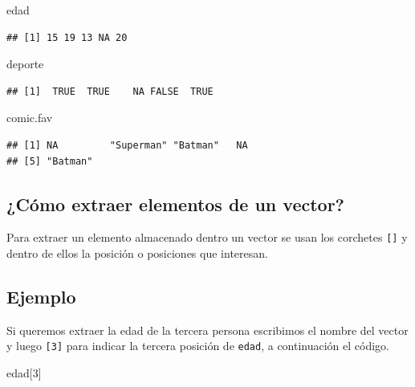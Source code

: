 \documentclass[10pt,]{krantz}
\makeatletter
\newenvironment{Shaded}{\begin{snugshade}}{\end{snugshade}}
\newcommand{\DecValTok}[1]{\textcolor[rgb]{0.00,0.00,0.81}{{#1}}}
\newcommand{\NormalTok}[1]{{#1}}
\newenvironment{kframe}{%
\medskip{}
\setlength{\fboxsep}{.8em}
 \def\at@end@of@kframe{}%
 \ifinner\ifhmode%
  \def\at@end@of@kframe{\end{minipage}}%
  \begin{minipage}{\columnwidth}%
 \fi\fi%
 \def\FrameCommand##1{\hskip\@totalleftmargin \hskip-\fboxsep
 \colorbox{shadecolor}{##1}\hskip-\fboxsep
     \hskip-\linewidth \hskip-\@totalleftmargin \hskip\columnwidth}%
 \MakeFramed {\advance\hsize-\width
   \@totalleftmargin\z@ \linewidth\hsize
   \@setminipage}}%
 {\par\unskip\endMakeFramed%
 \at@end@of@kframe}
\renewenvironment{Shaded}{\begin{kframe}}{\end{kframe}}
\makeatother
\begin{document}
\begin{Shaded}
\begin{Highlighting}[]
\NormalTok{edad}
\end{Highlighting}
\end{Shaded}

\begin{verbatim}
## [1] 15 19 13 NA 20
\end{verbatim}

\begin{Shaded}
\begin{Highlighting}[]
\NormalTok{deporte}
\end{Highlighting}
\end{Shaded}

\begin{verbatim}
## [1]  TRUE  TRUE    NA FALSE  TRUE
\end{verbatim}

\begin{Shaded}
\begin{Highlighting}[]
\NormalTok{comic.fav}
\end{Highlighting}
\end{Shaded}

\begin{verbatim}
## [1] NA         "Superman" "Batman"   NA        
## [5] "Batman"
\end{verbatim}

\subsection{¿Cómo extraer elementos de un
vector?}\label{como-extraer-elementos-de-un-vector}

Para extraer un elemento almacenado dentro un vector se usan los
corchetes \texttt{{[}{]}} y dentro de ellos la posición o posiciones que
interesan.

\subsection*{Ejemplo}\label{ejemplo}


Si queremos extraer la edad de la tercera persona escribimos el nombre
del vector y luego \texttt{{[}3{]}} para indicar la tercera posición de
\texttt{edad}, a continuación el código.

\begin{Shaded}
\begin{Highlighting}[]
\NormalTok{edad[}\DecValTok{3}\NormalTok{]}
\end{Highlighting}
\end{Shaded}
\end{document}
